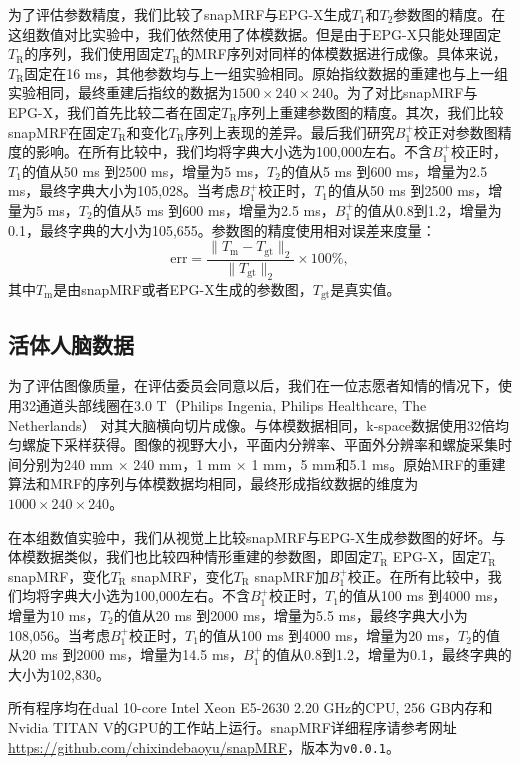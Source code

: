 为了评估参数精度，我们比较了snapMRF与EPG-X生成$T_1$和$T_2$参数图的精度。在这组数值对比实验中，我们依然使用了体模数据。但是由于EPG-X只能处理固定$T_\mathrm{R}$的序列，我们使用固定$T_\mathrm{R}$的MRF序列对同样的体模数据进行成像。具体来说，$T_\mathrm{R}$固定在16 ms，其他参数均与上一组实验相同。原始指纹数据的重建也与上一组实验相同，最终重建后指纹的数据为$1500 \times 240 \times 240$。为了对比snapMRF与EPG-X，我们首先比较二者在固定$T_\mathrm{R}$序列上重建参数图的精度。其次，我们比较snapMRF在固定$T_\mathrm{R}$和变化$T_\mathrm{R}$序列上表现的差异。最后我们研究$B_1^+$校正对参数图精度的影响。在所有比较中，我们均将字典大小选为100,000左右。不含$B_1^+$校正时，$T_1$的值从50 ms 到2500 ms，增量为5 ms，$T_2$的值从5 ms 到600 ms，增量为2.5 ms，最终字典大小为105,028。当考虑$B_1^+$校正时，$T_1$的值从50 ms 到2500 ms，增量为5 ms，$T_2$的值从5 ms 到600 ms，增量为2.5 ms，$B_1^+$的值从0.8到1.2，增量为0.1，最终字典的大小为105,655。参数图的精度使用相对误差来度量：
\begin{equation}
	\mathrm{err} = \frac{\|T_\mathrm{m}-T_\mathrm{gt}\|_2}{\|T_\mathrm{gt}\|_2}\times 100\%,
\end{equation}
其中$T_\mathrm{m}$是由snapMRF或者EPG-X生成的参数图，$T_\mathrm{gt}$是真实值。

\subsection{活体人脑数据}
为了评估图像质量，在评估委员会同意以后，我们在一位志愿者知情的情况下，使用32通道头部线圈在3.0 T（Philips Ingenia, Philips Healthcare, The Netherlands） 对其大脑横向切片成像。与体模数据相同，k-space数据使用32倍均匀螺旋下采样获得\cite{pipe_spiral_2014}。图像的视野大小，平面内分辨率、平面外分辨率和螺旋采集时间分别为240 mm $\times$ 240 mm，1 mm $\times$ 1 mm，5 mm和5.1 ms。原始MRF的重建算法和MRF的序列与体模数据均相同，最终形成指纹数据的维度为$1000 \times 240 \times 240$。

在本组数值实验中，我们从视觉上比较snapMRF与EPG-X生成参数图的好坏。与体模数据类似，我们也比较四种情形重建的参数图，即固定$T_\mathrm{R}$ EPG-X，固定$T_\mathrm{R}$ snapMRF，变化$T_\mathrm{R}$ snapMRF，变化$T_\mathrm{R}$ snapMRF加$B_1^+$校正。在所有比较中，我们均将字典大小选为100,000左右。不含$B_1^+$校正时，$T_1$的值从100 ms 到4000 ms，增量为10 ms，$T_2$的值从20 ms 到2000 ms，增量为5.5 ms，最终字典大小为108,056。当考虑$B_1^+$校正时，$T_1$的值从100 ms 到4000 ms，增量为20 ms，$T_2$的值从20 ms 到2000 ms，增量为14.5 ms，$B_1^+$的值从0.8到1.2，增量为0.1，最终字典的大小为102,830。

所有程序均在dual 10-core Intel Xeon E5-2630 2.20 GHz的CPU, 256 GB内存和Nvidia TITAN V的GPU的工作站上运行。snapMRF详细程序请参考网址\url{https://github.com/chixindebaoyu/snapMRF}，版本为\texttt{v0.0.1}。

